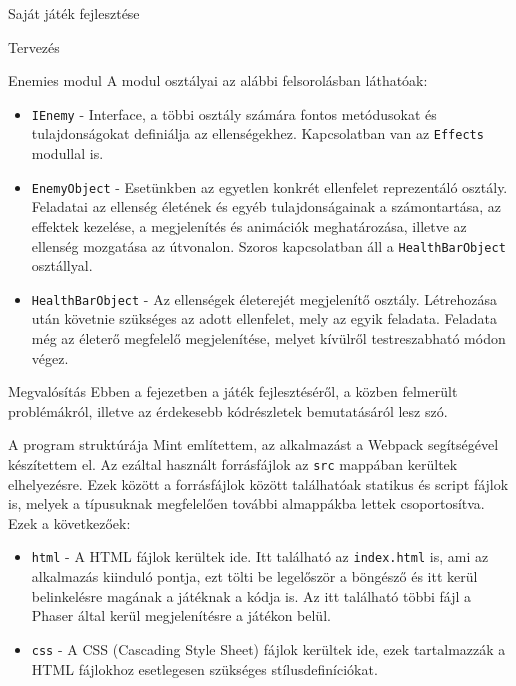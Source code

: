 \begin{MyChapter}{Saját játék fejlesztése}
\begin{MySection}{Tervezés}
\begin{MySubSection}{Enemies modul}
			A modul osztályai az alábbi felsorolásban láthatóak:
			\begin{itemize}			
				\item \texttt{IEnemy} - Interface, a többi osztály számára fontos metódusokat és tulajdonságokat definiálja az ellenségekhez. Kapcsolatban van az \texttt{Effects} modullal is.
				
				\item \texttt{EnemyObject} - Esetünkben az egyetlen konkrét ellenfelet reprezentáló osztály. Feladatai az ellenség életének és egyéb tulajdonságainak a számontartása, az effektek kezelése, a megjelenítés és animációk meghatározása, illetve az ellenség mozgatása az útvonalon. Szoros kapcsolatban áll a \texttt{HealthBarObject} osztállyal.
				
				\item \texttt{HealthBarObject} - Az ellenségek életerejét megjelenítő osztály. Létrehozása után követnie szükséges az adott ellenfelet, mely az egyik feladata. Feladata még az életerő megfelelő megjelenítése, melyet kívülről testreszabható módon végez.
				
			\end{itemize}
		\end{MySubSection}
	
	\end{MySection}
	
	\begin{MySection}{Megvalósítás}	
		Ebben a fejezetben a játék fejlesztéséről, a közben felmerült problémákról, illetve az érdekesebb kódrészletek bemutatásáról lesz szó.
		
		\begin{MySubSection}{A program struktúrája}
			Mint említettem, az alkalmazást a Webpack segítségével készítettem el. Az ezáltal használt forrásfájlok az \texttt{src} mappában kerültek elhelyezésre. Ezek között a forrásfájlok között találhatóak statikus és script fájlok is, melyek a típusuknak megfelelően további almappákba lettek csoportosítva.
			Ezek a következőek:
			
			\begin{itemize}
				\item \texttt{html} - A HTML fájlok kerültek ide. Itt található az \texttt{index.html} is, ami az alkalmazás kiinduló pontja, ezt tölti be legelőször a böngésző és itt kerül belinkelésre magának a játéknak a kódja is. Az itt található többi fájl a Phaser által kerül megjelenítésre a játékon belül.
				
				\item \texttt{css} - A CSS (Cascading Style Sheet) fájlok kerültek ide, ezek tartalmazzák a HTML fájlokhoz esetlegesen szükséges stílusdefiníciókat.
				

\end{itemize}
\end{MySubSection}
\end{MySection}
\end{MyChapter}
